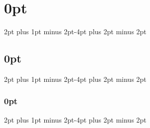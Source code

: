 
\usepackage[tmargin=2.2cm,bmargin=2.2cm,lmargin=2.5cm,rmargin=2.5cm]{geometry}
\setlength{\parindent}{0pt} %
\setlength{\parskip}{\baselineskip} %
\setlength{\baselineskip}{2.5pt}


\usepackage{titlesec}
\titlespacing\section{0pt}{2pt plus 1pt minus 2pt}{-4pt plus 2pt minus 2pt}
\titlespacing\subsection{0pt}{2pt plus 1pt minus 2pt}{-4pt plus 2pt minus 2pt}
\titlespacing\subsubsection{0pt}{2pt plus 1pt minus 2pt}{-4pt plus 2pt minus 2pt}

\usepackage{enumitem}


\usepackage[colorlinks=true,urlcolor=blue!30!black,linkcolor=blue!30!black,urlbordercolor={1 0 0},pdfborder=0]{hyperref}

\usepackage{graphicx} %
\graphicspath{{resources/}}
\usepackage{float}


\usepackage{tabularx}
\usepackage{amsmath,amsfonts,amsthm,amssymb}
\usepackage[usenames,dvipsnames,svgnames,table]{xcolor}


\usepackage{pdflscape}


\usepackage{minitoc}
\renewcommand{\mtctitle}{}   %
\setcounter{minitocdepth}{1} %
\nomtcrule                   %

